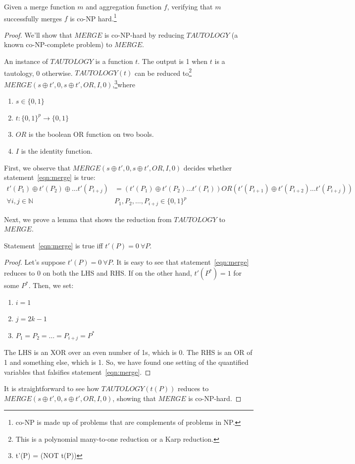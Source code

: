 \begin{theorem}
Given a merge function $m$ and aggregation function $f$, verifying that $m$ successfully
merges $f$ is co-NP hard.\footnote{co-NP is made up of problems
that are complements of problems in NP.}
\end{theorem}
\begin{proof}
We'll show that $MERGE$ is co-NP-hard by reducing $TAUTOLOGY$ (a known
co-NP-complete problem) to $MERGE$.

An instance of $TAUTOLOGY$ is a function $t$. The output is 1 when $t$ is a
tautology, 0 otherwise. $TAUTOLOGY(t)$ can be reduced to\footnote{This is a
polynomial many-to-one reduction or a Karp reduction.} $MERGE(s \oplus t', 0, s
\oplus t', OR, I, 0)$,\footnote{t'(P) = (NOT t(P))}where
\begin{enumerate}
\item $s \in \{0, 1\}$
\item $t : \{0, 1\}^p \rightarrow \{0, 1\}$
\item $OR$ is the boolean OR function on two bools.
\item $I$ is the identity function.
\end{enumerate}

First, we observe that $MERGE(s \oplus t', 0, s \oplus t', OR, I, 0)$ decides whether statement~\ref{eqn:merge} is true:
\begin{align}
t'(P_1) \oplus t'(P_2) \oplus \dots t'(P_{i+j}) & = (t'(P_1) \oplus t'(P_2) \dots t'(P_{i})) OR (t'(P_{i+1}) \oplus t'(P_{i+2}) \dots t'(P_{i+j})) \label{eqn:merge} \\
\forall i, j \in \mathbb{N} \ \ & P_1, P_2, \dots, P_{i+j} \in \{0, 1\}^p \nonumber
\end{align}

Next, we prove a lemma that shows the reduction from $TAUTOLOGY$ to $MERGE$.

\begin{lemma}
Statement~\ref{eqn:merge} is true iff $t'(P) = 0 \ \forall P$.
\end{lemma}
\begin{proof}
Let's suppose $t'(P) = 0 \ \forall P$. It is easy to see that statement~\ref{eqn:merge} reduces to 0 on both the LHS and RHS. If on the other hand, $t'(P^*) = 1$ for some $P^*$. Then, we set:
\begin{enumerate}
\item $i = 1$
\item $j = 2k - 1$
\item $P_1 = P_2 = \dots = P_{i+j} = P^*$
\end{enumerate}
The LHS is an XOR over an even number of 1s, which is 0. The RHS is an OR of 1
and something else, which is 1. So, we have found one setting of the quantified
variables that falsifies statement~\ref{eqn:merge}.
\vspace{\baselineskip}
\end{proof}

It is straightforward to see how $TAUTOLOGY(t(P))$
reduces to $MERGE(s \oplus t', 0, s \oplus t', OR, I, 0)$, showing that $MERGE$
is co-NP-hard.
\end{proof}
